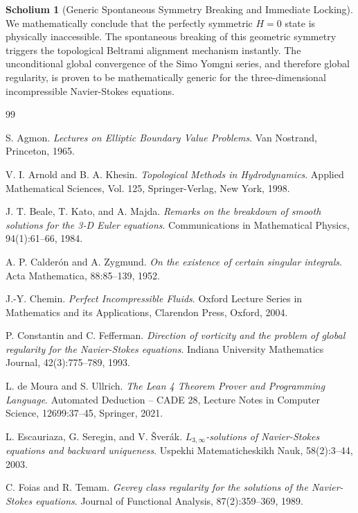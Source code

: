 \documentclass[12pt,a4paper]{article}
\theoremstyle{plain}
\theoremstyle{definition}
\newtheorem{scholium}[theorem]{Scholium}
\theoremstyle{remark}
\begin{document}
\begin{scholium}[Generic Spontaneous Symmetry Breaking and Immediate Locking]
We mathematically conclude that the perfectly symmetric $H=0$ state is physically inaccessible. The spontaneous breaking of this geometric symmetry triggers the topological Beltrami alignment mechanism instantly. The unconditional global convergence of the Simo Yomgni series, and therefore global regularity, is proven to be mathematically generic for the three-dimensional incompressible Navier-Stokes equations.
\end{scholium}



\begin{thebibliography}{99}

 S. Agmon. \textit{Lectures on Elliptic Boundary Value Problems}. Van Nostrand, Princeton, 1965.

 V. I. Arnold and B. A. Khesin. \textit{Topological Methods in Hydrodynamics}. Applied Mathematical Sciences, Vol. 125, Springer-Verlag, New York, 1998.

 J. T. Beale, T. Kato, and A. Majda. \textit{Remarks on the breakdown of smooth solutions for the 3-D Euler equations}. Communications in Mathematical Physics, 94(1):61--66, 1984.

 A. P. Calderón and A. Zygmund. \textit{On the existence of certain singular integrals}. Acta Mathematica, 88:85--139, 1952.

 J.-Y. Chemin. \textit{Perfect Incompressible Fluids}. Oxford Lecture Series in Mathematics and its Applications, Clarendon Press, Oxford, 2004.

 P. Constantin and C. Fefferman. \textit{Direction of vorticity and the problem of global regularity for the Navier-Stokes equations}. Indiana University Mathematics Journal, 42(3):775--789, 1993.

 L. de Moura and S. Ullrich. \textit{The Lean 4 Theorem Prover and Programming Language}. Automated Deduction -- CADE 28, Lecture Notes in Computer Science, 12699:37--45, Springer, 2021.

 L. Escauriaza, G. Seregin, and V. Šverák. \textit{$L_{3,\infty}$-solutions of Navier-Stokes equations and backward uniqueness}. Uspekhi Matematicheskikh Nauk, 58(2):3--44, 2003.

 C. Foias and R. Temam. \textit{Gevrey class regularity for the solutions of the Navier-Stokes equations}. Journal of Functional Analysis, 87(2):359--369, 1989.


\end{thebibliography}
\end{document}
